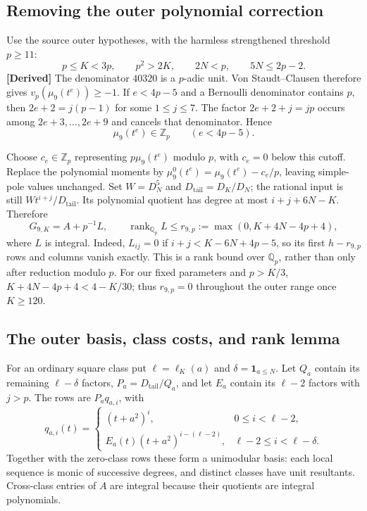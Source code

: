 \subsection{Removing the outer polynomial correction}
\label{s4-rank-correction}

Use the source outer hypotheses, with the harmless strengthened
threshold $p\geq11$:
\begin{equation}
 p\leq K<3p,\qquad p^2>2K,\qquad 2N<p,
 \qquad5N\leq2p-2.
 \label{s4-outer-range}
\end{equation}
\textbf{[Derived]}
The denominator $40320$ is a $p$-adic unit.  Von Staudt--Clausen
therefore gives $v_p(\mu_9(t^e))\geq-1$.
If $e<4p-5$ and a Bernoulli denominator contains $p$, then
$2e+2=j(p-1)$ for some $1\leq j\leq7$.
The factor $2e+2+j=jp$ occurs among $2e+3,\ldots,2e+9$ and
cancels that denominator.  Hence
\begin{equation}
 \mu_9(t^e)\in\mathbb Z_p\qquad(e<4p-5).
 \label{s4-moment-cutoff}
\end{equation}

Choose $c_e\in\mathbb Z_p$ representing $p\mu_9(t^e)$ modulo $p$,
with $c_e=0$ below this cutoff.  Replace the polynomial moments by
$\mu_9^0(t^e)=\mu_9(t^e)-c_e/p$, leaving simple-pole values
unchanged.  Set $W=D_N^5$ and $D_{\mathrm{tail}}=D_K/D_N$;
the rational input is still $Wt^{i+j}/D_{\mathrm{tail}}$.
Its polynomial quotient has degree at most $i+j+6N-K$.  Therefore
\begin{equation}
 G_{9,K}=A+p^{-1}L,\qquad
 \operatorname{rank}_{\mathbb Q_p}L\leq
 r_{9,p}:=\max(0,K+4N-4p+4),
 \label{s4-matrix-rank}
\end{equation}
where $L$ is integral.  Indeed,
$L_{ij}=0$ if $i+j<K-6N+4p-5$, so its first $h-r_{9,p}$
rows and columns vanish exactly.  This is a rank bound over
$\mathbb Q_p$, rather than only after reduction modulo $p$.
For our fixed parameters and $p>K/3$,
$K+4N-4p+4<4-K/30$; thus $r_{9,p}=0$ throughout the outer
range once $K\geq120$.

\subsection{The outer basis, class costs, and rank lemma}
\label{s4-outer-basis}

For an ordinary square class put $\ell=\ell_K(a)$ and
$\delta=\mathbf1_{a\leq N}$.  Let $Q_a$ contain its remaining
$\ell-\delta$ factors, $P_a=D_{\mathrm{tail}}/Q_a$, and let
$E_a$ contain its $\ell-2$ factors with $j>p$.  The rows are
$P_aq_{a,i}$, with
\begin{equation}
 q_{a,i}(t)=
 \begin{cases}
 (t+a^2)^i,&0\leq i<\ell-2,\\
 E_a(t)(t+a^2)^{i-(\ell-2)},&\ell-2\leq i<\ell-\delta.
 \end{cases}
 \label{s4-outer-polynomials}
\end{equation}
Together with the zero-class rows these form a unimodular basis:
each local sequence is monic of successive degrees, and distinct
classes have unit resultants.  Cross-class entries of $A$ are
integral because their quotients are integral polynomials.

